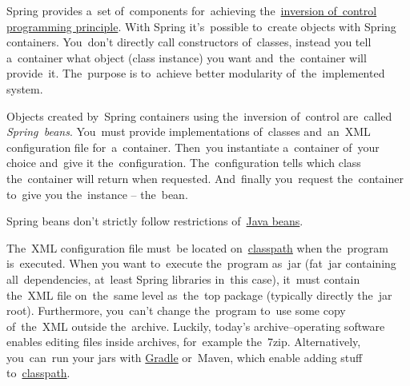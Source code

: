 \label{springinversionofcontrol}
Spring provides a~set of~components for~achieving the~\hyperref[inversionofcontrol]{inversion of~control programming principle}.
With Spring it's~possible to~create objects with Spring containers.
You~don't directly call constructors of~classes, instead you tell a~container what object (class instance) you want and~the~container will provide~it.
The~purpose is to~achieve better modularity of~the~implemented system.

Objects created by~Spring containers using the~inversion of~control are~called \textit{Spring~beans}.
You~must provide implementations of~classes and~an~XML configuration file for~a~container.
Then~you instantiate a~container of~your choice and~give it the~configuration.
The~configuration tells which class the~container will return when requested.
And~finally you~request the~container to~give you the~instance -- the~bean.

\warning Spring beans don't strictly follow restrictions of~\hyperref[javabeans]{Java beans}.

\warning The~XML configuration file must~be located on~\hyperref[classpath]{classpath} when the~program is~executed.
When you want to~execute the~program as~jar (fat~jar containing all~dependencies, at~least Spring libraries in~this case), it~must contain the~XML file on~the~same level as~the~top package (typically directly the~jar root).
Furthermore, you~can't change the~program to~use some copy of~the~XML outside the~archive.
Luckily, today's archive--operating software enables editing files inside archives, for~example the~7zip.
Alternatively, you~can~run your jars with \hyperref[gradle]{Gradle} or~Maven, which enable adding stuff to~\hyperref[classpath]{classpath}.
\newpage

